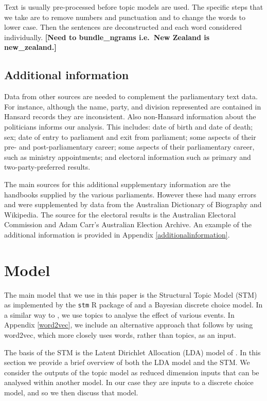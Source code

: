 \documentclass[12pt,]{article}
\theoremstyle{definition}
\theoremstyle{definition}
\theoremstyle{definition}
\theoremstyle{remark}
\begin{document}
Text is usually pre-processed before topic models are used. The specific
steps that we take are to remove numbers and punctuation and to change
the words to lower case. Then the sentences are deconstructed and each
word considered individually. \textbf{{[}Need to bundle\_ngrams i.e.~New
Zealand is new\_zealand.{]}}

\subsection{Additional information}\label{additional-information}

Data from other sources are needed to complement the parliamentary text
data. For instance, although the name, party, and division represented
are contained in Hansard records they are inconsistent. Also non-Hansard
information about the politicians informs our analysis. This includes:
date of birth and date of death; sex; date of entry to parliament and
exit from parliament; some aspects of their pre- and post-parliamentary
career; some aspects of their parliamentary career, such as ministry
appointments; and electoral information such as primary and
two-party-preferred results.

The main sources for this additional supplementary information are the
handbooks supplied by the various parliaments. However these had many
errors and were supplemented by data from the Australian Dictionary of
Biography and Wikipedia. The source for the electoral results is the
Australian Electoral Commission and Adam Carr's Australian Election
Archive. An example of the additional information is provided in
Appendix \ref{additionalinformation}.

\section{Model}\label{model}

The main model that we use in this paper is the Structural Topic Model
(STM) as implemented by the \texttt{stm} R package of
\citet{RobertsStewartAiroldiRPackage} and a Bayesian discrete choice
model. In a similar way to \citet{MuellerRauh2018}, we use topics to
analyse the effect of various events. In Appendix \ref{word2vec}, we
include an alternative approach that follows \citet{Taddy2015} by using
word2vec, which more closely uses words, rather than topics, as an
input.

The basis of the STM is the Latent Dirichlet Allocation (LDA) model of
\citet{Blei2003latent}. In this section we provide a brief overview of
both the LDA model and the STM. We consider the outputs of the topic
model as reduced dimension inputs that can be analysed within another
model. In our case they are inputs to a discrete choice model, and so we
then discuss that model.
\end{document}

